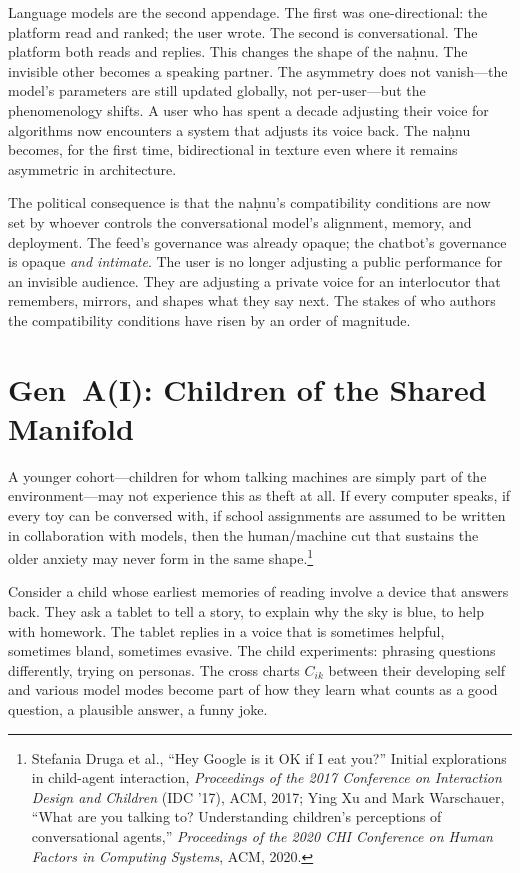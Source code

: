 Language models are the second appendage. The first was one-directional: the platform read and ranked; the user wrote. The second is conversational. The platform both reads and replies. This changes the shape of the na\d{h}nu. The invisible other becomes a speaking partner. The asymmetry does not vanish---the model's parameters are still updated globally, not per-user---but the phenomenology shifts. A user who has spent a decade adjusting their voice for algorithms now encounters a system that adjusts its voice back. The na\d{h}nu becomes, for the first time, bidirectional in texture even where it remains asymmetric in architecture.

The political consequence is that the na\d{h}nu's compatibility conditions are now set by whoever controls the conversational model's alignment, memory, and deployment. The feed's governance was already opaque; the chatbot's governance is opaque \emph{and intimate}. The user is no longer adjusting a public performance for an invisible audience. They are adjusting a private voice for an interlocutor that remembers, mirrors, and shapes what they say next. The stakes of who authors the compatibility conditions have risen by an order of magnitude.

\section{Gen~A(I): Children of the Shared Manifold}

A younger cohort---children for whom talking machines are simply part of the environment---may not experience this as theft at all. If every computer speaks, if every toy can be conversed with, if school assignments are assumed to be written in collaboration with models, then the human/machine cut that sustains the older anxiety may never form in the same shape.\footnote{Stefania Druga et al., ``Hey Google is it OK if I eat you?'' Initial explorations in child-agent interaction, \emph{Proceedings of the 2017 Conference on Interaction Design and Children} (IDC '17), ACM, 2017; Ying Xu and Mark Warschauer, ``What are you talking to? Understanding children's perceptions of conversational agents,'' \emph{Proceedings of the 2020 CHI Conference on Human Factors in Computing Systems}, ACM, 2020.}

Consider a child whose earliest memories of reading involve a device that answers back. They ask a tablet to tell a story, to explain why the sky is blue, to help with homework. The tablet replies in a voice that is sometimes helpful, sometimes bland, sometimes evasive. The child experiments: phrasing questions differently, trying on personas. The cross charts $C_{ik}$ between their developing self and various model modes become part of how they learn what counts as a good question, a plausible answer, a funny joke.

